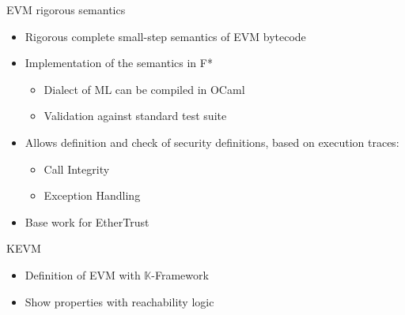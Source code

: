 \begin{frame}{EVM rigorous semantics}

    \begin{block}{\cite{grishchenko2018semantic}}
        \begin{itemize}
            \item Rigorous complete small-step semantics of EVM bytecode
            \item Implementation of the semantics in F*
            \begin{itemize}
                \item Dialect of ML can be compiled in OCaml
                \item Validation against standard test suite
            \end{itemize}
            \item Allows definition and check of security definitions, based on
            execution traces:
            \begin{itemize}
                \item Call Integrity
                \item Exception Handling
            \end{itemize}
            \item Base work for EtherTrust
        \end{itemize}
    \end{block}

    \begin{block}{KEVM~\cite{bib:kevm}}
        \begin{itemize}
            \item Definition of EVM with $\mathbb{K}$-Framework
            \item Show properties with reachability logic
        \end{itemize}
    \end{block}

\end{frame}
